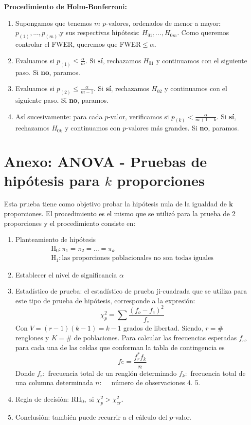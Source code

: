 \documentclass{article}
\theoremstyle{definition}
\begin{document}
\textbf{Procedimiento de Holm-Bonferroni:} 
\begin{enumerate}[I]
	\item Supongamos que tenemos $m$ $p$-valores, ordenados de menor a mayor: $p_{(1)}, \ldots, p_{(m)}$,y sus respectivas hipótesis: $H_{01}, \ldots, H_{0m}$. Como queremos controlar el FWER, queremos que FWER$\leq\alpha$.
	\item Evaluamos si $p_{(1)}\leq \frac{\alpha}{m}$. Si \textbf{sí}, rechazamos $H_{01}$ y continuamos con el siguiente paso. Si \textbf{no}, paramos.
	\item Evaluamos si $p_{(2)}\leq \frac{\alpha}{m-1}$. Si \textbf{sí}, rechazamos $H_{02}$ y continuamos con el siguiente paso. Si \textbf{no}, paramos.
	\item Así sucesivamente: para cada $p$-valor, verificamos si $p_{(k)}<\frac{\alpha}{m+1-k}$.  Si \textbf{sí}, rechazamos $H_{0k}$ y continuamos con $p$-valores más grandes. Si \textbf{no}, paramos.
\end{enumerate}
\section{Anexo: ANOVA - Pruebas de hipótesis para $k$ proporciones}\label{anexo}
Esta prueba tiene como objetivo probar la hipótesis nula de la igualdad de $\boldsymbol{k}$ proporciones. El procedimiento es el mismo que se utilizó para la prueba de 2 proporciones y el procedimiento consiste en:
\begin{enumerate}[I]
	\item Planteamiento de hipótesis
	$$
	\begin{array}{l}
		\mathrm{H}_{0}: \pi_{1}=\pi_{2}=\ldots =\pi_{k} \\
		\mathrm{H}_{1}: \text{las proporciones poblacionales no son todas iguales}
	\end{array}
	$$
	\item Establecer el nivel de significancia $\alpha$
	\item Estadístico de prueba: el estadístico de prueba ji-cuadrada que se utiliza
	para este tipo de prueba de hipótesis, corresponde a la expresión:
	$$
	\chi_{p}^{2}=\sum \frac{(f_o-f_e)^{2}}{f_e}
	$$
	Con $V=(r-1)(k-1)=k-1$ grados de libertad.
	Siendo, $r= \#$ renglones y $K=\#$ de poblaciones. 	Para calcular las frecuencias esperadas $f_{e}$, para cada una de las celdas que conforman la tabla de
	contingencia es
	$$
	f e=\frac{f_{r}^{*} f_{k}}{n}
	$$
	Donde
	$f_{r}:$ frecuencia total de un renglón determinado
	$f_{k}:$ frecuencia total de una columna determinada
	$n: \quad$ número de observaciones
	4. 
	5. 
	\item Regla de decisión:	$\mathrm{RH}_{0}, \text{ si } \chi_{p}^{2}>\chi_{c r}^{2}$.
	\item Conclusión: también puede recurrir a el cálculo del $p$-valor.
\end{enumerate}
\end{document}
